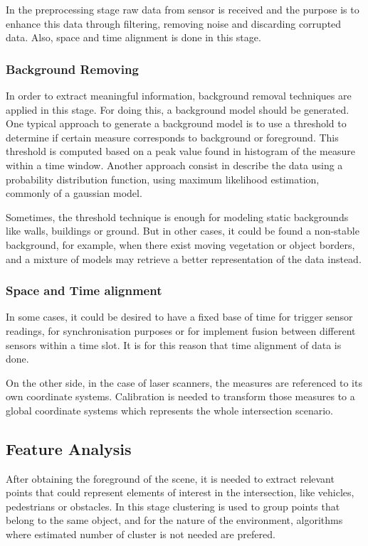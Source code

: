 \documentclass[10pt,twocolumn,letterpaper]{article}
\begin{document}
 In the preprocessing stage raw data from sensor is received and the purpose is to enhance this data through filtering, removing noise and discarding corrupted data. Also, space and time alignment is done in this stage.

\subsubsection{Background Removing}
 
In order to extract meaningful information, background removal techniques are applied in this stage. For doing this, a background model should be generated. One typical approach to generate a background model is to use a threshold to determine if certain measure corresponds to background or foreground. This threshold is computed based on a peak value found in histogram of the measure within a time window. Another approach consist in describe the data using a probability distribution function, using maximum likelihood estimation, commonly of a gaussian model.
 
Sometimes, the threshold technique is enough for modeling static backgrounds like walls, buildings or ground. But in other cases, it could be found a non-stable background, for example, when there exist moving vegetation or object borders, and a mixture of models may retrieve a better representation of the data instead.

\subsubsection{Space and Time alignment}

In some cases, it could be desired to have a fixed base of time for trigger sensor readings, for synchronisation purposes or for implement fusion between different sensors within a time slot. It is for this reason that time alignment of data is done.

On the other side, in the case of laser scanners, the measures are referenced to its own coordinate systems. Calibration is needed to transform those measures to a global coordinate systems which represents the whole intersection scenario. 

\subsection{Feature Analysis}

After obtaining the foreground of the scene, it is needed to extract relevant points that could represent elements of interest in the intersection, like vehicles, pedestrians or obstacles. In this stage clustering is used to group points that belong to the same object, and for the nature of the environment, algorithms where estimated number of cluster is not needed are prefered. 
\end{document}
